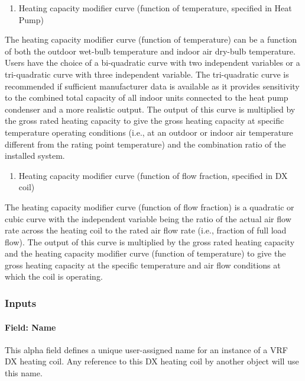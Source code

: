 \begin{enumerate}
\def\labelenumi{\arabic{enumi})}
\tightlist
\item
  Heating capacity modifier curve (function of temperature, specified in Heat Pump)
\end{enumerate}

The heating capacity modifier curve (function of temperature) can be a function of both the outdoor wet-bulb temperature and indoor air dry-bulb temperature. Users have the choice of a bi-quadratic curve with two independent variables or a tri-quadratic curve with three independent variable. The tri-quadratic curve is recommended if sufficient manufacturer data is available as it provides sensitivity to the combined total capacity of all indoor units connected to the heat pump condenser and a more realistic output. The output of this curve is multiplied by the gross rated heating capacity to give the gross heating capacity at specific temperature operating conditions (i.e., at an outdoor or indoor air temperature different from the rating point temperature) and the combination ratio of the installed system.

\begin{enumerate}
\def\labelenumi{\arabic{enumi})}
\setcounter{enumi}{1}
\tightlist
\item
  Heating capacity modifier curve (function of flow fraction, specified in DX coil)
\end{enumerate}

The heating capacity modifier curve (function of flow fraction) is a quadratic or cubic curve with the independent variable being the ratio of the actual air flow rate across the heating coil to the rated air flow rate (i.e., fraction of full load flow). The output of this curve is multiplied by the gross rated heating capacity and the heating capacity modifier curve (function of temperature) to give the gross heating capacity at the specific temperature and air flow conditions at which the coil is operating.

\subsubsection{Inputs}\label{inputs-7-010}

\paragraph{Field: Name}\label{field-name-6-007}

This alpha field defines a unique user-assigned name for an instance of a VRF DX heating coil. Any reference to this DX heating coil by another object will use this name.

